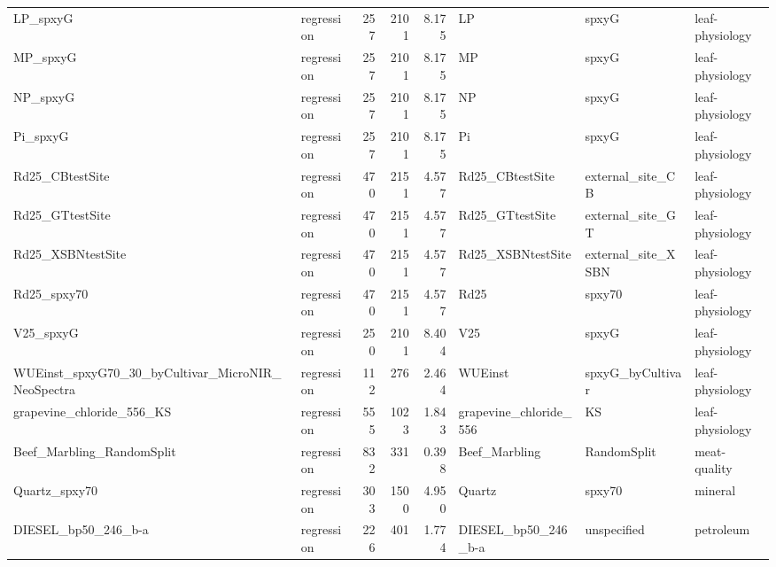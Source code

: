 \begin{landscape}
\begin{longtable}{L{6.2cm}L{2.1cm}rrrL{6.0cm}L{2.6cm}L{3.0cm}}
LP\_\allowbreak{}spxyG & regression & 257 & 2101 & 8.175 & LP & spxyG & leaf-\allowbreak{}physiology \\
MP\_\allowbreak{}spxyG & regression & 257 & 2101 & 8.175 & MP & spxyG & leaf-\allowbreak{}physiology \\
NP\_\allowbreak{}spxyG & regression & 257 & 2101 & 8.175 & NP & spxyG & leaf-\allowbreak{}physiology \\
Pi\_\allowbreak{}spxyG & regression & 257 & 2101 & 8.175 & Pi & spxyG & leaf-\allowbreak{}physiology \\
Rd25\_\allowbreak{}CBtestSite & regression & 470 & 2151 & 4.577 & Rd25\_\allowbreak{}CBtestSite & external\_\allowbreak{}site\_\allowbreak{}CB & leaf-\allowbreak{}physiology \\
Rd25\_\allowbreak{}GTtestSite & regression & 470 & 2151 & 4.577 & Rd25\_\allowbreak{}GTtestSite & external\_\allowbreak{}site\_\allowbreak{}GT & leaf-\allowbreak{}physiology \\
Rd25\_\allowbreak{}XSBNtestSite & regression & 470 & 2151 & 4.577 & Rd25\_\allowbreak{}XSBNtestSite & external\_\allowbreak{}site\_\allowbreak{}XSBN & leaf-\allowbreak{}physiology \\
Rd25\_\allowbreak{}spxy70 & regression & 470 & 2151 & 4.577 & Rd25 & spxy70 & leaf-\allowbreak{}physiology \\
V25\_\allowbreak{}spxyG & regression & 250 & 2101 & 8.404 & V25 & spxyG & leaf-\allowbreak{}physiology \\
WUEinst\_\allowbreak{}spxyG70\_\allowbreak{}30\_\allowbreak{}byCultivar\_\allowbreak{}MicroNIR\_\allowbreak{}NeoSpectra & regression & 112 & 276 & 2.464 & WUEinst & spxyG\_\allowbreak{}byCultivar & leaf-\allowbreak{}physiology \\
grapevine\_\allowbreak{}chloride\_\allowbreak{}556\_\allowbreak{}KS & regression & 555 & 1023 & 1.843 & grapevine\_\allowbreak{}chloride\_\allowbreak{}556 & KS & leaf-\allowbreak{}physiology \\
Beef\_\allowbreak{}Marbling\_\allowbreak{}RandomSplit & regression & 832 & 331 & 0.398 & Beef\_\allowbreak{}Marbling & RandomSplit & meat-\allowbreak{}quality \\
Quartz\_\allowbreak{}spxy70 & regression & 303 & 1500 & 4.950 & Quartz & spxy70 & mineral \\
DIESEL\_\allowbreak{}bp50\_\allowbreak{}246\_\allowbreak{}b-\allowbreak{}a & regression & 226 & 401 & 1.774 & DIESEL\_\allowbreak{}bp50\_\allowbreak{}246\_\allowbreak{}b-\allowbreak{}a & unspecified & petroleum \\

\end{longtable}
\end{landscape}
